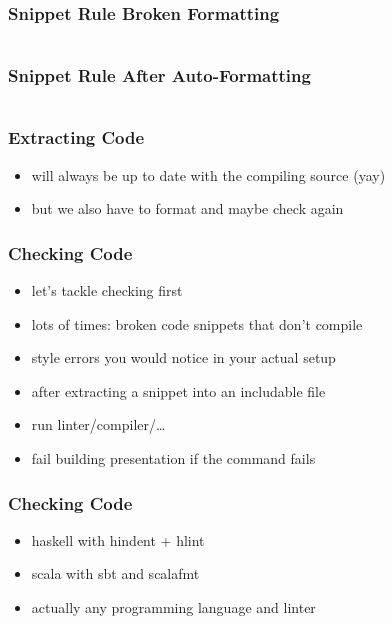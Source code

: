 \documentclass{beamer}
\begin{document}
\begin{frame}
  \frametitle{Snippet Rule \textemdash{} Broken Formatting}
  \begin{center}
    \inputminted[autogobble, highlightlines={3}]{haskell}{snippets/outer-haskell-snippet-rule.hs_noformat}
  \end{center}
\end{frame}

\begin{frame}
  \frametitle{Snippet Rule \textemdash{} After Auto-Formatting}
  \begin{center}
    \inputminted[autogobble, highlightlines={2-4}]{haskell}{snippets/haskell-snippet-rule.hs}
  \end{center}
\end{frame}

\begin{frame}
  \frametitle{Extracting Code}
  \begin{itemize}
  \item will always be up to date with the compiling source (yay)
  \item but we also have to format and maybe check again
  \end{itemize}
\end{frame}

\begin{frame}
  \frametitle{Checking Code}
  \begin{itemize}
  \item let's tackle checking first
  \item lots of times: broken code snippets that don't compile
  \item style errors you would notice in your actual setup
  \item after extracting a snippet into an includable file
  \item run linter/compiler/\ldots
  \item fail building presentation if the command fails
  \end{itemize}
\end{frame}

\begin{frame}
  \frametitle{Checking Code}
  \begin{itemize}
  \item haskell with hindent + hlint
  \item scala with sbt and scalafmt
  \item actually any programming language and linter
  \end{itemize}
\end{frame}
\end{document}
